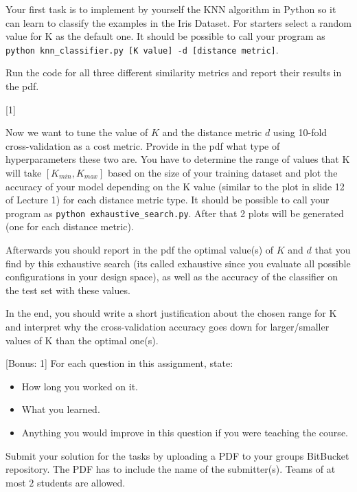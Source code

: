 \documentclass{exam}
\begin{document}
\begin{questions}
\begin{itemize}
		\end{itemize}	
		
		Your first task is to implement by yourself the KNN algorithm in Python so it can learn to classify the examples in the Iris Dataset. For starters select a random value for K as the default one. It should be possible to call your program as \texttt{python knn\_classifier.py [K value] -d [distance metric]}.
			
		Run the code for all three different similarity metrics and report their results in the pdf.
		
		[1]
		
		Now we want to tune the value of $K$ and the distance metric $d$ using 10-fold cross-validation as a cost metric. 
		Provide in the pdf what type of hyperparameters these two are.
		You have to determine the range of values that K will take $[K_{min}, K_{max}]$ based on the size of your training dataset and plot the accuracy of your model depending on the K value (similar to the plot in slide 12 of Lecture 1) for each distance metric type. 
		It should be possible to call your program as \texttt{python exhaustive\_search.py}. After that 2 plots will be generated (one for each distance metric).
		
		Afterwards you should report in the pdf the optimal value(s) of $K$ and $d$ that you find by this exhaustive search (its called exhaustive since you evaluate all possible configurations in your design space), as well as the accuracy of the classifier on the test set with these values. 
		
		In the end, you should write a short justification about the chosen range for K and interpret why the cross-validation accuracy goes down for larger/smaller values of K than the optimal one(s).

		
		[Bonus: 1]
		For each question in this assignment, state:
		\begin{itemize}
			\item How long you worked on it.
			\item What you learned.
			\item Anything you would improve in this question if you were teaching the course.
		\end{itemize}
	\end{questions}
	
	\noindent
	Submit your solution for the tasks by uploading a PDF to your groups BitBucket repository. The PDF has to include the name of the submitter(s). Teams of at most $2$ students are allowed.
\end{document}
